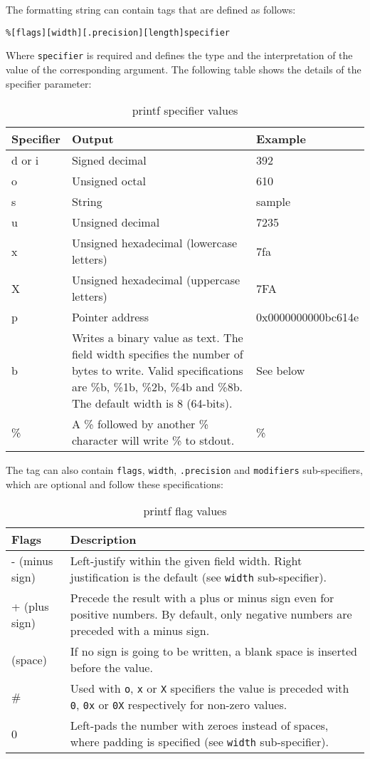\documentclass[twoside,english]{article}
\providecommand{\tabularnewline}{\\}
\newenvironment{vindent}
{\begin{list}{}{\setlength{\listparindent}{6pt}}
\item[]}
{\end{list}}
\begin{document}
The formatting string can contain tags that are defined as follows:

\begin{vindent}
\begin{verbatim}
%[flags][width][.precision][length]specifier
\end{verbatim}
\end{vindent}
Where \texttt{specifier} is required and defines the type and the interpretation
of the value of the corresponding argument. The following table shows the
details of the specifier parameter:

\begin{table}[H]
\caption{printf specifier values}
\begin{tabular}{|>{\raggedright}p{1in}|>{\raggedright}p{3.5in}|>{\raggedright}p{1.25in}|}
\hline
\textbf{Specifier}&
\textbf{Output}&
\textbf{Example}\tabularnewline
\hline
\hline
d or i&
Signed decimal&
392\tabularnewline
\hline
o&
Unsigned octal&
610\tabularnewline
\hline
s&
String&
sample\tabularnewline
\hline
u&
Unsigned decimal&
7235\tabularnewline
\hline
x&
Unsigned hexadecimal (lowercase letters)&
7fa\tabularnewline
\hline
X&
Unsigned hexadecimal (uppercase letters)&
7FA\tabularnewline
\hline
p&
Pointer address&
0x0000000000bc614e\tabularnewline
\hline
b&
Writes a binary value as text. The field width specifies the number of bytes
to write. Valid specifications are \%b, \%1b, \%2b, \%4b and \%8b. The default
width is 8 (64-bits).&
See below\tabularnewline
\hline
\%&
A \% followed by another \% character will write \% to stdout.&
\%\tabularnewline
\hline
\end{tabular}
\end{table}
The tag can also contain \texttt{flags}, \texttt{width}, \texttt{.precision}
and \texttt{modifiers} sub-specifiers, which are optional and follow these
specifications:

\begin{table}[H]
\caption{printf flag values}
\begin{tabular}{|>{\raggedright}p{1.5in}|>{\raggedright}p{4.5in}|}
\hline
\textbf{Flags}&
\textbf{Description}\tabularnewline
\hline
\hline
- (minus sign)&
Left-justify within the given field width. Right justification is the default
(see \texttt{width} sub-specifier).\tabularnewline
\hline
+ (plus sign)&
Precede the result with a plus or minus sign even for positive numbers. By
default, only negative numbers are preceded with a minus sign.\tabularnewline
\hline
(space)&
If no sign is going to be written, a blank space is inserted before the value.\tabularnewline
\hline
\#&
Used with \texttt{o}, \texttt{x} or \texttt{X} specifiers the value is preceded
with \texttt{0}, \texttt{0x} or \texttt{0X} respectively for non-zero values.\tabularnewline
\hline
0&
Left-pads the number with zeroes instead of spaces, where padding is specified
(see \texttt{width} sub-specifier).\tabularnewline
\hline
\end{tabular}
\end{table}
\end{document}
